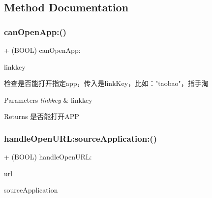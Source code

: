 \subsection{Method Documentation}
\mbox{\label{interface_a_l_p_t_b_link_partner_s_d_k_a986d89d683a8286fc6ca072a930052f4}} 
\subsubsection{\texorpdfstring{can\+Open\+App\+:()}{canOpenApp:()}}
{\footnotesize\ttfamily + (B\+O\+OL) can\+Open\+App\+: \begin{DoxyParamCaption}\item[{(nonnull N\+S\+String $\ast$)}]{linkkey }\end{DoxyParamCaption}}

检查是否能打开指定app，传入是link\+Key，比如："taobao"，指手淘


\begin{DoxyParams}{Parameters}
{\em linkkey} & linkkey\\
\hline
\end{DoxyParams}
\begin{DoxyReturn}{Returns}
是否能打开\+A\+PP 
\end{DoxyReturn}
\mbox{\label{interface_a_l_p_t_b_link_partner_s_d_k_a59567d237a2c01c60e8bcd0a26c7c9a9}} 
\subsubsection{\texorpdfstring{handle\+Open\+U\+R\+L\+:source\+Application\+:()}{handleOpenURL:sourceApplication:()}}
{\footnotesize\ttfamily + (B\+O\+OL) handle\+Open\+U\+R\+L\+: \begin{DoxyParamCaption}\item[{(nonnull N\+S\+U\+RL $\ast$)}]{url }\item[{sourceApplication:(nullable N\+S\+String $\ast$)}]{source\+Application }\end{DoxyParamCaption}}

